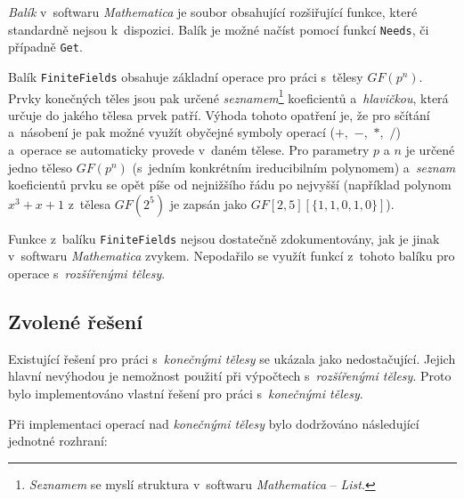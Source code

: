 \documentclass[thesis=M,czech,hidelinks]{FITthesis}[2012/06/26]
\newcommand{\0}{{\textcolor[gray]{0.75}{0}}}
\begin{document}
\emph{Balík} v~softwaru \emph{Mathematica} je soubor obsahující rozšiřující
funkce, které standardně nejsou k~dispozici. Balík je možné načíst pomocí funkcí
\texttt{Needs}, či případně \texttt{Get}.

Balík \texttt{FiniteFields} obsahuje základní operace pro práci s~tělesy
$GF(p^n)$. Prvky konečných těles jsou pak určené \emph{seznamem}\footnote{
    \emph{Seznamem} se myslí struktura v~softwaru \emph{Mathematica}
    -- \emph{List}.
} koeficientů a~\emph{hlavičkou}, která určuje do jakého tělesa prvek patří.
Výhoda tohoto opatření je, že pro sčítání a~násobení je pak možné využít
obyčejné symboly operací ($+$,~$-$,~$*$,~$/$) a~operace se automaticky provede
v~daném tělese. Pro parametry $p$ a $n$ je určené jedno těleso $GF(p^n)$
(s~jedním konkrétním ireducibilním polynomem) a~\emph{seznam} koeficientů prvku
se opět píše od nejnižšího řádu po nejvyšší (například polynom $x^3 + x + 1$
z~tělesa $GF(2^5)$ je zapsán jako $GF[2,5][\{1,1,0,1,0\}] $).

Funkce z~balíku \texttt{FiniteFields} nejsou dostatečně zdokumentovány, jak je
jinak v~softwaru \emph{Mathematica} zvykem. Nepodařilo se využít funkcí z~tohoto
balíku pro operace s~\emph{rozšířenými tělesy}.


\subsection{Zvolené řešení}\label{kap_zvolene_reseni}

Existující řešení pro práci s~\emph{konečnými tělesy} se ukázala jako
nedostačující. Jejich hlavní nevýhodou je nemožnost použití při výpočtech
s~\emph{rozšířenými tělesy}. Proto bylo implementováno vlastní řešení pro práci
s~\emph{konečnými tělesy}.

Při implementaci operací nad \emph{konečnými tělesy} bylo dodržováno následující
jednotné rozhraní:
\end{document}
